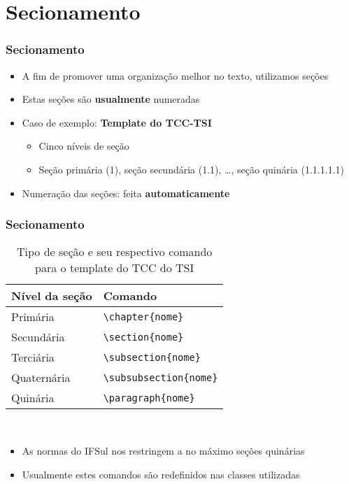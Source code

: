 \section{Secionamento}

\begin{frame}[fragile] \frametitle{Secionamento}
\begin{itemize}
	\item A fim de promover uma organização melhor no texto, utilizamos seções
	\item Estas seções são \textbf{usualmente} numeradas
	\item Caso de exemplo: \textbf{Template do TCC-TSI}
	\begin{itemize}
		\item Cinco níveis de seção
		\item Seção primária (1), seção secundária (1.1), \ldots, seção quinária (1.1.1.1.1)
	\end{itemize}
	\item Numeração das seções: feita \textbf{automaticamente}
\end{itemize}
\end{frame}

\begin{frame}[fragile] \frametitle{Secionamento}
\begin{table}[!t]
	\centering
	\caption{Tipo de seção e seu respectivo comando para o template do TCC do TSI}	
	\begin{tabular}{l|l}
	\hline
		\textbf{Nível da seção} & \textbf{Comando}                      \\ \hline
		Primária                & \texttt{\textbackslash{}chapter\{nome\}}       \\ \hline
		Secundária              & \texttt{\textbackslash{}section\{nome\}}       \\ \hline
		Terciária               & \texttt{\textbackslash{}subsection\{nome\}}    \\ \hline
		Quaternária             & \texttt{\textbackslash{}subsubsection\{nome\}} \\ \hline
		Quinária                & \texttt{\textbackslash{}paragraph\{nome\}}     \\ \hline
	\end{tabular}
	\\ \vspace{0.3cm} \ownsrc
\end{table}

\begin{itemize}
	\item As normas do IFSul nos restringem a no máximo seções quinárias
	\item Usualmente estes comandos são redefinidos nas classes utilizadas
\end{itemize}
\end{frame}

